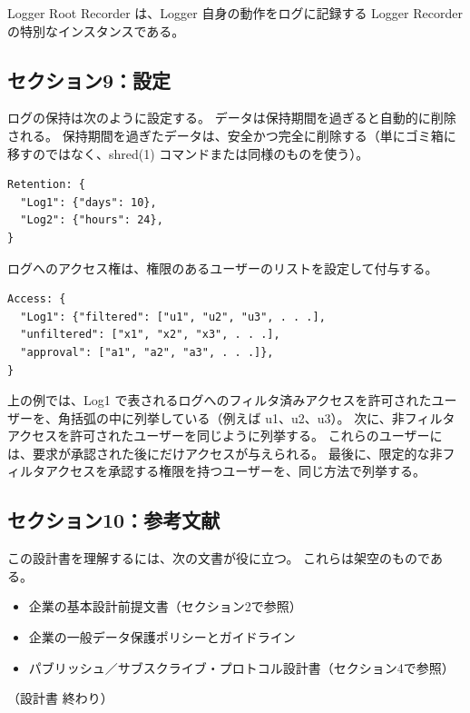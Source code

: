 \documentclass[uplatex]{jsarticle}
\begin{document}
Logger Root Recorder は、Logger 自身の動作をログに記録する Logger Recorder の特別なインスタンスである。

\subsection{セクション9：設定}

ログの保持は次のように設定する。
データは保持期間を過ぎると自動的に削除される。
保持期間を過ぎたデータは、安全かつ完全に削除する（単にゴミ箱に移すのではなく、shred(1) コマンドまたは同様のものを使う）。
\begin{verbatim}
Retention: {
  "Log1": {"days": 10},
  "Log2": {"hours": 24},
}
\end{verbatim}

ログへのアクセス権は、権限のあるユーザーのリストを設定して付与する。
\begin{verbatim}
Access: {
  "Log1": {"filtered": ["u1", "u2", "u3", . . .],
  "unfiltered": ["x1", "x2", "x3", . . .],
  "approval": ["a1", "a2", "a3", . . .]},
}
\end{verbatim}

上の例では、Log1 で表されるログへのフィルタ済みアクセスを許可されたユーザーを、角括弧の中に列挙している（例えば u1、u2、u3）。
次に、非フィルタアクセスを許可されたユーザーを同じように列挙する。
これらのユーザーには、要求が承認された後にだけアクセスが与えられる。
最後に、限定的な非フィルタアクセスを承認する権限を持つユーザーを、同じ方法で列挙する。

\subsection{セクション10：参考文献}

この設計書を理解するには、次の文書が役に立つ。
これらは架空のものである。
\begin{itemize}
\item 企業の基本設計前提文書（セクション2で参照）
\item 企業の一般データ保護ポリシーとガイドライン
\item パブリッシュ／サブスクライブ・プロトコル設計書（セクション4で参照）
\end{itemize}

\begin{center}
（設計書 終わり）
\end{center}
\end{document}
